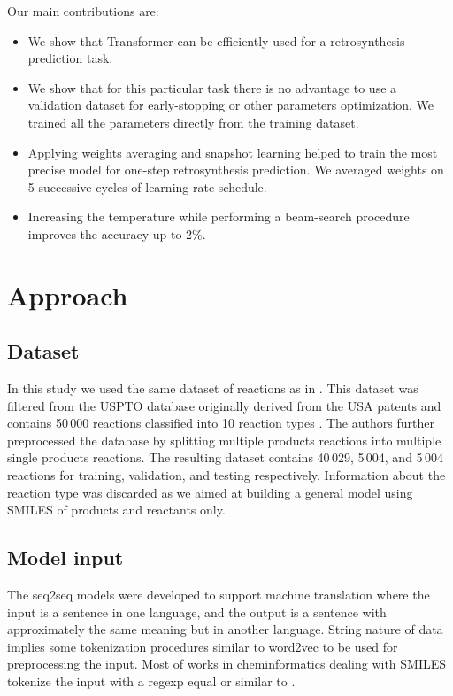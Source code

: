 \documentclass{article}
\begin{document}
Our main contributions are:
\begin{itemize}
\item We show that Transformer can be efficiently used for a retrosynthesis prediction task.
\item We show that for this particular task there is no advantage to use a validation dataset for early-stopping or other parameters optimization. We trained all the parameters directly from the training dataset.
\item Applying weights averaging and snapshot learning helped to train the most precise model for one-step retrosynthesis prediction. We averaged weights on 5 successive cycles of learning rate schedule.
\item Increasing the temperature while performing a beam-search procedure improves the accuracy up to 2\%. 
\end{itemize}

\section{Approach}
\label{sec:approach}

\subsection{Dataset}

In this study we used the same dataset of reactions as in \cite{Pande}. 
This dataset was filtered from the USPTO database \cite{Lowe} originally derived from the USA patents and 
contains 50\,000 reactions classified into 10 reaction types \cite{Schneider}. The authors \cite{Pande} further preprocessed the database by 
splitting multiple products reactions into multiple single products reactions. The resulting dataset contains 40\,029, 5\,004, and 5\,004 reactions for training, validation, and testing respectively. Information about the reaction type 
was discarded as we aimed at building a general model using SMILES of products and reactants only.


\subsection{Model input}
The seq2seq models were developed to support machine translation where the input is a sentence in one language, and the output is a sentence with approximately the same meaning but in another language. String nature of data implies some tokenization procedures similar to word2vec to be used for preprocessing the input. Most of works in cheminformatics dealing with SMILES tokenize the input with a regexp equal or similar to \cite{SchwallerTranslation}. 
\end{document}
